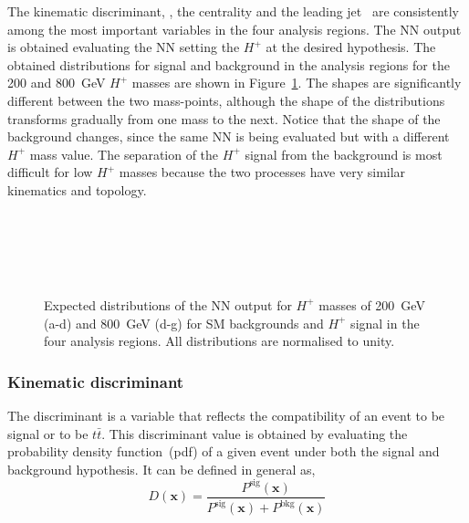 The kinematic discriminant, \HTjets, the centrality and the leading jet \pT\ are consistently among the most important variables in the four analysis regions. The NN output is obtained evaluating the NN setting the $H^+$ at the desired hypothesis. The obtained distributions for signal and background in the analysis regions for the 200 and 800~GeV $H^+$ masses are shown in Figure~\ref{Hplustb:NNshapes}. The shapes are significantly different between the two mass-points, although the shape of the distributions transforms gradually from one mass to the next. Notice that the shape of the background changes, since the same NN is being evaluated but with a different $H^+$ mass value. The separation of the $H^+$ signal from the background is most difficult for low $H^+$ masses because the two processes have very similar kinematics and topology.

\begin{figure}[htb]
    \RawFloats
    \centering
     \\
     \\
     \\
     \\
    \caption{Expected distributions of the NN output for $H^+$ masses of 200~GeV (a-d)
    and 800~GeV (d-g) for SM backgrounds and $H^+$ signal in the four analysis regions.
    All distributions are normalised to unity.
    }
    \label{Hplustb:NNshapes}
\end{figure}
\clearpage
\subsubsection{Kinematic discriminant}

The discriminant is a variable that reflects the compatibility of an event to be signal or to be $t\bar{t}$. This discriminant value is obtained by evaluating the probability density function~(pdf) of a given event under both the signal and background hypothesis. It can be defined in general as,
\begin{equation}
    D(\textbf{x})=\frac{P^{\text{sig}}(\textbf{x})}{P^{\text{sig}}(\textbf{x})+P^{\text{bkg}}(\textbf{x})}
    \label{eq3:discriminant}
\end{equation}

